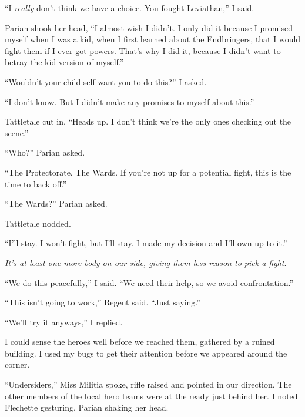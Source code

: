 ``I \emph{really} don't think we have a choice.  You fought Leviathan,'' I said.



Parian shook her head, ``I almost wish I didn't.  I only did it because I promised myself when I was a kid, when I first learned about the Endbringers, that I would fight them if I ever got powers.  That's why I did it, because I didn't want to betray the kid version of myself.''



``Wouldn't your child-self want you to do this?''  I asked.



``I don't know.  But I didn't make any promises to myself about this.''



Tattletale cut in.  ``Heads up.  I don't think we're the only ones checking out the scene.''



``Who?'' Parian asked.



``The Protectorate.  The Wards.  If you're not up for a potential fight, this is the time to back off.''



``The Wards?'' Parian asked.



Tattletale nodded.



``I'll stay.  I won't fight, but I'll stay.  I made my decision and I'll own up to it.''



\emph{It's at least one more body on our side, giving them less reason to pick a fight}.



``We do this peacefully,'' I said.  ``We need their help, so we avoid confrontation.''



``This isn't going to work,'' Regent said.  ``Just saying.''



``We'll try it anyways,'' I replied.



I could sense the heroes well before we reached them, gathered by a ruined building.  I used my bugs to get their attention before we appeared around the corner.



``Undersiders,'' Miss Militia spoke, rifle raised and pointed in our direction.  The other members of the local hero teams were at the ready just behind her.  I noted Flechette gesturing, Parian shaking her head.



